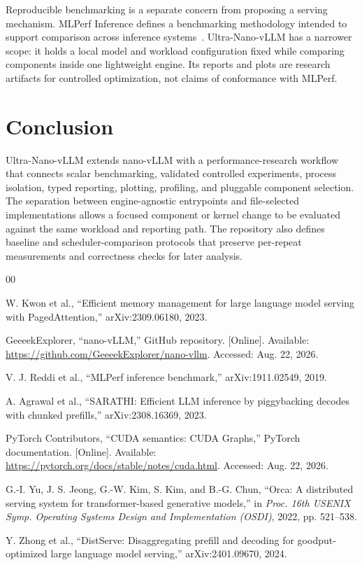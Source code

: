\documentclass[conference]{IEEEtran}
\begin{document}
Reproducible benchmarking is a separate concern from proposing a serving
mechanism. MLPerf Inference defines a benchmarking methodology intended to
support comparison across inference systems~\cite{reddi2019mlperf}.
Ultra-Nano-vLLM has a narrower scope: it holds a local model and workload
configuration fixed while comparing components inside one lightweight engine.
Its reports and plots are research artifacts for controlled optimization, not
claims of conformance with MLPerf.

\section{Conclusion}

Ultra-Nano-vLLM extends nano-vLLM with a performance-research workflow that
connects scalar benchmarking, validated controlled experiments, process
isolation, typed reporting, plotting, profiling, and pluggable component
selection. The separation between engine-agnostic entrypoints and
file-selected implementations allows a focused component or kernel change to
be evaluated against the same workload and reporting path. The repository also
defines baseline and scheduler-comparison protocols that preserve per-repeat
measurements and correctness checks for later analysis.

\begin{thebibliography}{00}

W. Kwon et al., ``Efficient memory management for large language model serving
with PagedAttention,'' arXiv:2309.06180, 2023.

GeeeekExplorer, ``nano-vLLM,'' GitHub repository. [Online]. Available:
\url{https://github.com/GeeeekExplorer/nano-vllm}. Accessed: Aug. 22, 2026.

V. J. Reddi et al., ``MLPerf inference benchmark,'' arXiv:1911.02549, 2019.

A. Agrawal et al., ``SARATHI: Efficient LLM inference by piggybacking decodes
with chunked prefills,'' arXiv:2308.16369, 2023.

PyTorch Contributors, ``CUDA semantics: CUDA Graphs,'' PyTorch documentation.
[Online]. Available: \url{https://pytorch.org/docs/stable/notes/cuda.html}.
Accessed: Aug. 22, 2026.

G.-I. Yu, J. S. Jeong, G.-W. Kim, S. Kim, and B.-G. Chun, ``Orca: A
distributed serving system for transformer-based generative models,'' in
\emph{Proc. 16th USENIX Symp. Operating Systems Design and Implementation
(OSDI)}, 2022, pp. 521--538.

Y. Zhong et al., ``DistServe: Disaggregating prefill and decoding for
goodput-optimized large language model serving,'' arXiv:2401.09670, 2024.

\end{thebibliography}
\end{document}
